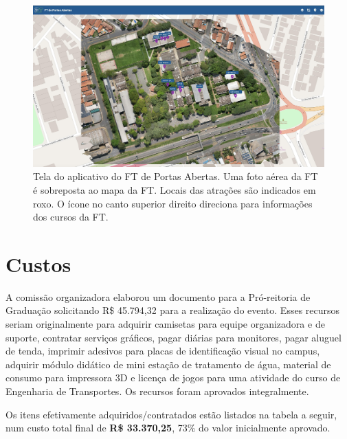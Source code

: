 \documentclass[
  letterpaper,
  DIV=11,
  numbers=noendperiod]{scrreprt}
\begin{document}
\begin{figure}[H]

{\centering \includegraphics[width=1.1\linewidth,height=\textheight,keepaspectratio]{planejamento/app-mapa-Ulisses.jpg}

}

\caption{Tela do aplicativo do FT de Portas Abertas. Uma foto aérea da
FT é sobreposta ao mapa da FT. Locais das atrações são indicados em
roxo. O ícone no canto superior direito direciona para informações dos
cursos da FT.}

\end{figure}%


\chapter{Custos}\label{custos}

A comissão organizadora elaborou um documento para a Pró-reitoria de
Graduação solicitando R\$ 45.794,32 para a realização do evento. Esses
recursos seriam originalmente para adquirir camisetas para equipe
organizadora e de suporte, contratar serviços gráficos, pagar diárias
para monitores, pagar aluguel de tenda, imprimir adesivos para placas de
identificação visual no campus, adquirir módulo didático de mini estação
de tratamento de água, material de consumo para impressora 3D e licença
de jogos para uma atividade do curso de Engenharia de Transportes. Os
recursos foram aprovados integralmente.

Os itens efetivamente adquiridos/contratados estão listados na tabela a
seguir, num custo total final de \textbf{R\$ 33.370,25}, 73\% do valor
inicialmente aprovado.
\end{document}
